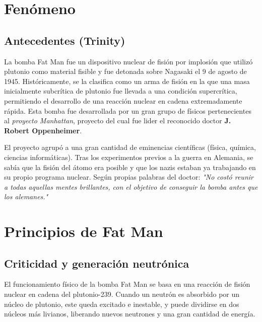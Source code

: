 \documentclass[12pt,a4paper]{article}
\begin{document}
\sloppy

\newpage
\tableofcontents
\newpage

\begin{abstract}
    El presente documento presenta la historia y descripción del fenómeno a desarrollar como parte de un trabajo practico para la materia dictada en 2026, llamada "Física III". Mediante un desarrollo analítico, se realiza un modelo Físico-Matemático del fenómeno para la elaboración de dicho informe, representación y simulación de lo acontecido en ese evento.
    
\end{abstract}
\section{Fenómeno}
\subsection{Antecedentes (Trinity)}
    La bomba Fat Man fue un dispositivo nuclear de fisión por implosión que utilizó plutonio como material fisible y fue detonada sobre Nagasaki el 9 de agosto de 1945. Históricamente, se la clasifica como un arma de fisión en la que una masa inicialmente subcrítica de plutonio fue llevada a una condición supercrítica, permitiendo el desarrollo de una reacción nuclear en cadena extremadamente rápida. Esta bomba fue desarrollada por un gran grupo de físicos pertenecientes al \textit{proyecto Manhattan}, proyecto del cual fue lider el reconocido doctor \textbf{J. Robert Oppenheimer}.
    
    El proyecto agrupó a una gran cantidad de eminencias científicas (física, química, ciencias informáticas). Tras los experimentos previos a la guerra en Alemania, se sabía que la fisión del átomo era posible y que los nazis estaban ya trabajando en su propio programa nuclear. Según propias palabras del doctor: \textit{"No costó reunir a todas aquellas mentes brillantes, con el objetivo de conseguir la bomba antes que los alemanes."}
    
\section{Principios de Fat Man}
\subsection{Criticidad y generación neutrónica}
    El funcionamiento físico de la bomba Fat Man se basa en una reacción de fisión nuclear en cadena del plutonio-239. Cuando un neutrón es absorbido por un núcleo de plutonio, este queda excitado e inestable, y puede dividirse en dos núcleos más livianos, liberando nuevos neutrones y una gran cantidad de energía.
\end{document}

